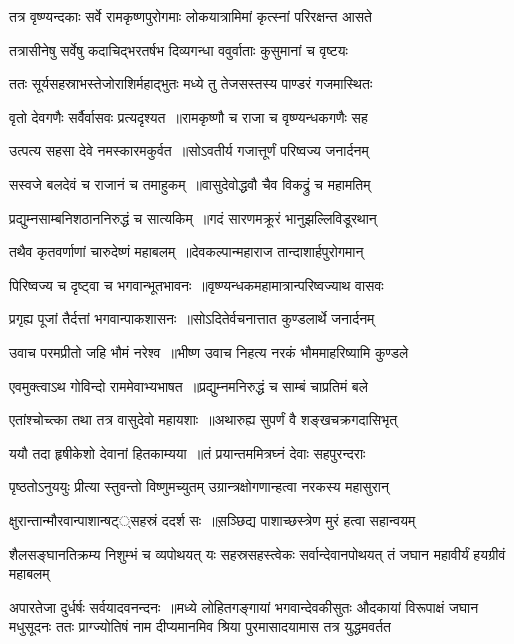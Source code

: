 \twolineshloka
{तत्र वृष्ण्यन्दकाः सर्वे रामकृष्णपुरोगमाः}
{लोकयात्रामिमां कृत्स्नां परिरक्षन्त आसते}


\twolineshloka
{तत्रासीनेषु सर्वेषु कदाचिद्भरतर्षभ}
{दिव्यगन्धा ववुर्वाताः कुसुमानां च वृष्टयः}


\threelineshloka
{ततः सूर्यसहस्राभस्तेजोराशिर्महाद्भुतः}
{मध्ये तु तेजसस्तस्य पाण्डरं गजमास्थितः}
{}


\twolineshloka
{वृतो देवगणैः सर्वैर्वासवः प्रत्यदृश्यत ॥रामकृष्णौ च राजा च वृष्ण्यन्धकगणैः सह}
{}


\twolineshloka
{उत्पत्य सहसा देवे नमस्कारमकुर्वत ॥सोऽवतीर्य गजात्तूर्णं परिष्वज्य जनार्दनम्}
{}


\twolineshloka
{सस्वजे बलदेवं च राजानं च तमाहुकम् ॥वासुदेवोद्धवौ चैव विकद्रुं च महामतिम्}
{}


\twolineshloka
{प्रद्युम्नसाम्बनिशठाननिरुद्धं च सात्यकिम् ॥गदं सारणमक्रूरं भानुझल्लिविडूरथान्}
{}


\twolineshloka
{तथैव कृतवर्णाणां चारुदेष्णं महाबलम् ॥देवकल्पान्महाराज तान्दाशार्हपुरोगमान्}
{}


\twolineshloka
{पिरिष्वज्य च दृष्ट्वा च भगवान्भूतभावनः ॥वृष्ण्यन्धकमहामात्रान्परिष्वज्याथ वासवः}
{}


\twolineshloka
{प्रगृह्य पूजां तैर्दत्तां भगवान्पाकशासनः ॥सोऽदितेर्वचनात्तात कुण्डलार्थे जनार्दनम्}
{}


\threelineshloka
{उवाच परमप्रीतो जहि भौमं नरेश्व ॥भीष्ण उवाच}
{निहत्य नरकं भौममाहरिष्यामि कुण्डले}
{}


\twolineshloka
{एवमुक्त्वाऽथ गोविन्दो राममेवाभ्यभाषत ॥प्रद्युम्नमनिरुद्धं च साम्बं चाप्रतिमं बले}
{}


\twolineshloka
{एतांश्चोच्त्का तथा तत्र वासुदेवो महायशाः ॥अथारुह्य सुपर्णं वै शङ्खचक्रगदासिभृत्}
{}


\twolineshloka
{ययौ तदा हृषीकेशो देवानां हितकाम्यया ॥तं प्रयान्तममित्रघ्नं देवाः सहपुरन्दराः}
{}


\threelineshloka
{पृष्ठतोऽनुययुः प्रीत्या स्तुवन्तो विष्णुमच्युतम्}
{उग्रान्त्रक्षोगणान्हत्वा नरकस्य महासुरान्}
{}


\twolineshloka
{क्षुरान्तान्मौरवान्पाशान्षट््सहस्रं ददर्श सः ॥स़ञ्छिद्य पाशाच्छस्त्रेण मुरं हत्वा सहान्वयम्}
{}


शैलसङ्घानतिक्रम्य निशुम्भं च व्यपोथयत्
\twolineshloka
{यः सहस्रसहस्त्वेकः सर्वान्देवानपोथयत्}
{तं जघान महावीर्यं हयग्रीवं महाबलम्}


अपारतेजा दुर्धर्षः सर्वयादवनन्दनः ॥मध्ये लोहितगङ्गायां भगवान्देवकीसुतः
\threelineshloka
{औदकायां विरूपाक्षं जघान मधुसूदनः}
{ततः प्राग्ज्योतिषं नाम दीप्यमानमिव श्रिया}
{पुरमासादयामास तत्र युद्धमवर्तत}


